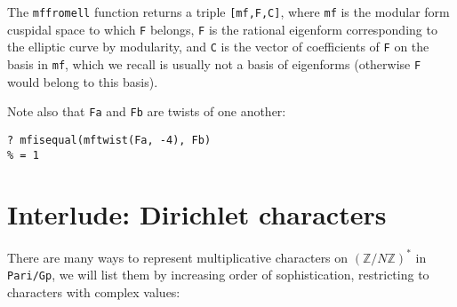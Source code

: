 \documentclass[11pt]{article}
\newcommand{\Z}{{\mathbb Z}}
\def\kbd#1{{\tt #1}}
\begin{document}
The \kbd{mffromell} function returns a triple \kbd{[mf,F,C]},
where \kbd{mf} is the modular form cuspidal space to which \kbd{F} belongs,
\kbd{F} is the rational eigenform corresponding to the elliptic curve by
modularity, and \kbd{C} is the vector of coefficients of \kbd{F} on the
basis in \kbd{mf}, which we recall is usually not a basis of eigenforms
(otherwise \kbd{F} would belong to this basis).

Note also that \kbd{Fa} and \kbd{Fb} are twists of one another:

\begin{verbatim}
? mfisequal(mftwist(Fa, -4), Fb)
% = 1
\end{verbatim}

\section{Interlude: Dirichlet characters}

There are many ways to represent multiplicative characters on $(\Z/N\Z)^*$ in
\kbd{Pari/Gp}, we will list them by increasing order of sophistication,
restricting to characters with complex values:
\end{document}
